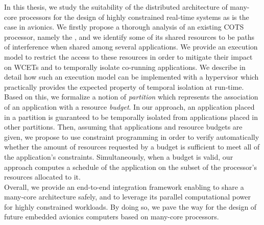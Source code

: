 \documentclass[main.tex]{subfiles}
\begin{document}
In this thesis, we study the suitability of the distributed architecture of
many-core processors for the design of highly constrained real-time systems as
is the case in avionics. We firstly propose a thorough analysis of an existing
COTS processor, namely the \mppalong, and we identify some of its shared
resources to be paths of interference when shared among several applications. We
provide an execution model to restrict the access to these resources in order to
mitigate their impact on WCETs and to temporally isolate co-running
applications. We describe in detail how such an execution model can be
implemented with a hypervisor which practically provides the expected property
of temporal isolation at run-time. Based on this, we formalize a notion of
\emph{partition} which represents the association of an application with a
resource \emph{budget}. In our approach, an application placed in a partition is
guaranteed to be temporally isolated from applications placed in other
partitions. Then, assuming that applications and resource budgets are given, we
propose to use constraint programming in order to verify automatically whether
the amount of resources requested by a budget is sufficient to meet all of the
application's constraints. Simultaneously, when a budget is valid, our approach
computes a schedule of the application on the subset of the processor's
resources allocated to it.  \\

Overall, we provide an end-to-end integration framework enabling to share a
many-core architecture safely, and to leverage its parallel computational power
for highly constrained workloads. By doing so, we pave the way for the design of
future embedded avionics computers based on many-core processors.

\cleardoublepage
\end{document}
